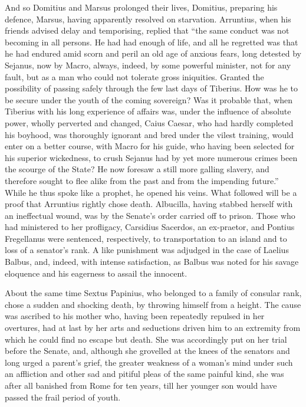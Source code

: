 
And so Domitius and Marsus prolonged their lives, Domitius, preparing his defence, Marsus, having apparently resolved on starvation. Arruntius, when his friends advised delay and temporising, replied that ``the same conduct was not becoming in all persons. He had had enough of life, and all he regretted was that he had endured amid scorn and peril an old age of anxious fears, long detested by Sejanus, now by Macro, always, indeed, by some powerful minister, not for any fault, but as a man who could not tolerate gross iniquities. Granted the possibility of passing safely through the few last days of Tiberius. How was he to be secure under the youth of the coming sovereign? Was it probable that, when Tiberius with his long experience of affairs was, under the influence of absolute power, wholly perverted and changed, Caius Caesar, who had hardly completed his boyhood, was thoroughly ignorant and bred under the vilest training, would enter on a better course, with Macro for his guide, who having been selected for his superior wickedness, to crush Sejanus had by yet more numerous crimes been the scourge of the State? He now foresaw a still more galling slavery, and therefore sought to flee alike from the past and from the impending future.'' While he thus spoke like a prophet, he opened his veins. What followed will be a proof that Arruntius rightly chose death. Albucilla, having stabbed herself with an ineffectual wound, was by the Senate's order carried off to prison. Those who had ministered to her profligacy, Carsidius Sacerdos, an ex-praetor, and Pontius Fregellanus were sentenced, respectively, to transportation to an island and to loss of a senator's rank. A like punishment was adjudged in the case of Laelius Balbus, and, indeed, with intense satisfaction, as Balbus was noted for his savage eloquence and his eagerness to assail the innocent.


About the same time Sextus Papinius, who belonged to a family of consular rank, chose a sudden and shocking death, by throwing himself from a height. The cause was ascribed to his mother who, having been repeatedly repulsed in her overtures, had at last by her arts and seductions driven him to an extremity from which he could find no escape but death. She was accordingly put on her trial before the Senate, and, although she grovelled at the knees of the senators and long urged a parent's grief, the greater weakness of a woman's mind under such an affliction and other sad and pitiful pleas of the same painful kind, she was after all banished from Rome for ten years, till her younger son would have passed the frail period of youth.

